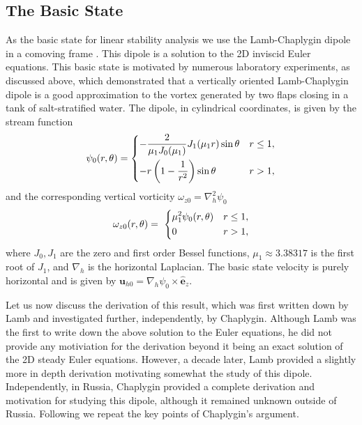 \subsection{The Basic State} 
As the basic state for linear stability analysis we use the Lamb-Chaplygin dipole in a comoving frame \cite{meleshko1994}. This dipole is a solution to the 2D inviscid Euler equations. This basic state is motivated by numerous laboratory experiments\cite{bc2000a,leweke1998}, as discussed above, which demonstrated that a vertically oriented Lamb-Chaplygin dipole is a good approximation to the vortex generated by two flaps closing in a tank of salt-stratified water. The dipole, in cylindrical coordinates, is given by the stream function
\begin{align}
\psi_{0}(r,\theta) = 
\begin{dcases}
-\frac{2}{\mu_{1}J_{0}(\mu_{1})}J_{1}(\mu_{1}r)\sin\theta & r\le 1,\\\label{lc_dipole_sf}
-r\left(1-\frac{1}{r^{2}}\right)\sin\theta & r>1 ,
\end{dcases}
\end{align}
and the corresponding vertical vorticity $\omega_{z0}=\nabla_{h}^{2}\psi_{0}$
\begin{align}
\omega_{z0}(r,\theta) = \
\begin{dcases}
\mu_{1}^{2}\psi_{0}(r,\theta) & r\le 1,\\
0 & r>1,
\end{dcases}
\end{align}
where $J_{0},J_{1}$ are the zero and first order Bessel functions, $\mu_{1}\approx 3.38317$ is the first root of $J_{1}$, and $\nabla_{h}$ is the horizontal Laplacian. The basic state velocity is purely horizontal and is given by $\bm{u}_{h0}=\nabla_{h}\psi_{0}\times\hat{\bm{e}}_{z}$.

Let us now discuss the derivation of this result, which was first written down by Lamb and investigated further, independently, by Chaplygin. Although Lamb was the first to write down the above solution to the Euler equations, he did not provide any motiviation for the derivation beyond it being an exact solution of the 2D steady Euler equations. However, a decade later, Lamb provided a slightly more in depth derivation motivating somewhat the study of this dipole. Independently, in Russia, Chaplygin provided a complete derivation and motivation for studying this dipole, although it remained unknown outside of Russia. Following \cite{meleshko1994} we repeat the key points of Chaplygin's argument. 

